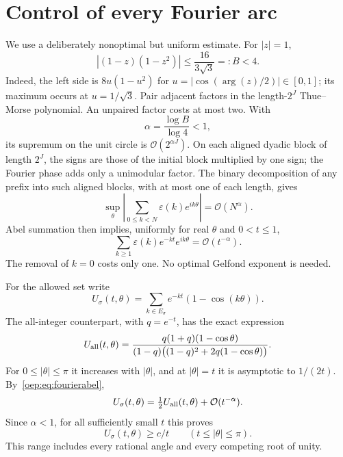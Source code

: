 \documentclass[11pt,letterpaper]{article}
\theoremstyle{remark}\newtheorem{remark}[theorem]{Remark}
\newcommand{\eps}{\varepsilon}
\newcommand{\OO}{\mathcal O}
\begin{document}
\section{Control of every Fourier arc}\label{oep:sec:arcs}
We use a deliberately nonoptimal but uniform estimate. For $|z|=1$,
\begin{equation}\label{oep:eq:pairbound}
 |(1-z)(1-z^2)|\leq\frac{16}{3\sqrt3}=:B<4.
\end{equation}
Indeed, the left side is $8u(1-u^2)$ for $u=|\cos(\arg(z)/2)|\in[0,1]$; its maximum occurs at $u=1/\sqrt3$. Pair adjacent factors in the length-$2^J$ Thue--Morse polynomial. An unpaired factor costs at most two. With
\[
 \alpha=\frac{\log B}{\log4}<1,
\]
its supremum on the unit circle is $\OO(2^{\alpha J})$. On each aligned dyadic block of length $2^J$, the signs are those of the initial block multiplied by one sign; the Fourier phase adds only a unimodular factor. The binary decomposition of any prefix into such aligned blocks, with at most one of each length, gives
\begin{equation}\label{oep:eq:fourierprefix}
 \sup_\theta\left|\sum_{0\leq k<N}\eps(k)e^{ik\theta}\right|=\OO(N^\alpha).
\end{equation}
Abel summation then implies, uniformly for real $\theta$ and $0<t\leq1$,
\begin{equation}\label{oep:eq:fourierabel}
 \sum_{k\geq1}\eps(k)e^{-kt}e^{ik\theta}=\OO(t^{-\alpha}).
\end{equation}
The removal of $k=0$ costs only one. No optimal Gelfond exponent is needed.

For the allowed set write
\[
 U_\sigma(t,\theta)=\sum_{k\in E_\sigma}e^{-kt}(1-\cos(k\theta)).
\]
The all-integer counterpart, with $q=e^{-t}$, has the exact expression
\begin{equation}\label{oep:eq:Uall}
 U_{\rm all}(t,\theta)=
 \frac{q(1+q)(1-\cos\theta)}
 {(1-q)\bigl((1-q)^2+2q(1-\cos\theta)\bigr)}.
\end{equation}
For $0\leq|\theta|\leq\pi$ it increases with $|\theta|$, and at $|\theta|=t$ it is asymptotic to $1/(2t)$. By~\eqref{oep:eq:fourierabel},
\[
 U_\sigma(t,\theta)=\tfrac12U_{\rm all}(t,\theta)+\OO(t^{-\alpha}).
\]
Since $\alpha<1$, for all sufficiently small $t$ this proves
\begin{equation}\label{oep:eq:Uouter}
 U_\sigma(t,\theta)\geq c/t\qquad(t\leq|\theta|\leq\pi).
\end{equation}
This range includes every rational angle and every competing root of unity.
\end{document}
